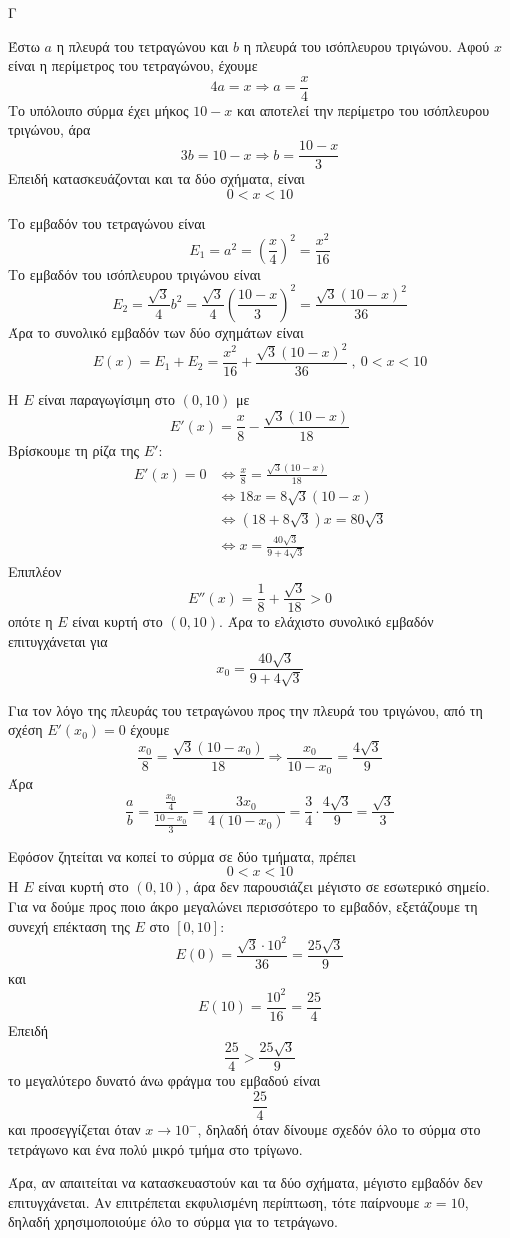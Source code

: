 \begin{thema}{Γ}
\begin{erwthma}
\item Έστω $a$ η πλευρά του τετραγώνου και $b$ η πλευρά του ισόπλευρου τριγώνου.
Αφού $x$ είναι η περίμετρος του τετραγώνου, έχουμε
\[4a=x\Rightarrow a=\frac{x}{4}\]
Το υπόλοιπο σύρμα έχει μήκος $10-x$ και αποτελεί την περίμετρο του ισόπλευρου τριγώνου, άρα
\[3b=10-x\Rightarrow b=\frac{10-x}{3}\]
Επειδή κατασκευάζονται και τα δύο σχήματα, είναι
\[0<x<10\]

\item Το εμβαδόν του τετραγώνου είναι
\[E_1=a^2=\left(\frac{x}{4}\right)^2=\frac{x^2}{16}\]
Το εμβαδόν του ισόπλευρου τριγώνου είναι
\[E_2=\frac{\sqrt{3}}{4}b^2=\frac{\sqrt{3}}{4}\left(\frac{10-x}{3}\right)^2=\frac{\sqrt{3}(10-x)^2}{36}\]
Άρα το συνολικό εμβαδόν των δύο σχημάτων είναι
\[E(x)=E_1+E_2=\frac{x^2}{16}+\frac{\sqrt{3}(10-x)^2}{36}\ ,\ 0<x<10\]

\item Η $E$ είναι παραγωγίσιμη στο $(0,10)$ με
\[E'(x)=\frac{x}{8}-\frac{\sqrt{3}(10-x)}{18}\]
Βρίσκουμε τη ρίζα της $E'$:
\begin{align*}
E'(x)=0
&\Leftrightarrow \frac{x}{8}=\frac{\sqrt{3}(10-x)}{18}\\
&\Leftrightarrow 18x=8\sqrt{3}(10-x)\\
&\Leftrightarrow (18+8\sqrt{3})x=80\sqrt{3}\\
&\Leftrightarrow x=\frac{40\sqrt{3}}{9+4\sqrt{3}}
\end{align*}
Επιπλέον
\[E''(x)=\frac{1}{8}+\frac{\sqrt{3}}{18}>0\]
οπότε η $E$ είναι κυρτή στο $(0,10)$. Άρα το ελάχιστο συνολικό εμβαδόν επιτυγχάνεται για
\[x_0=\frac{40\sqrt{3}}{9+4\sqrt{3}}\]

Για τον λόγο της πλευράς του τετραγώνου προς την πλευρά του τριγώνου, από τη σχέση $E'(x_0)=0$ έχουμε
\[\frac{x_0}{8}=\frac{\sqrt{3}(10-x_0)}{18}\Rightarrow \frac{x_0}{10-x_0}=\frac{4\sqrt{3}}{9}\]
Άρα
\[\frac{a}{b}=\frac{\frac{x_0}{4}}{\frac{10-x_0}{3}}=\frac{3x_0}{4(10-x_0)}=\frac{3}{4}\cdot\frac{4\sqrt{3}}{9}=\frac{\sqrt{3}}{3}\]

\item Εφόσον ζητείται να κοπεί το σύρμα σε δύο τμήματα, πρέπει
\[0<x<10\]
Η $E$ είναι κυρτή στο $(0,10)$, άρα δεν παρουσιάζει μέγιστο σε εσωτερικό σημείο.
Για να δούμε προς ποιο άκρο μεγαλώνει περισσότερο το εμβαδόν, εξετάζουμε τη συνεχή επέκταση της $E$ στο $[0,10]$:
\[E(0)=\frac{\sqrt{3}\cdot 10^2}{36}=\frac{25\sqrt{3}}{9}\]
και
\[E(10)=\frac{10^2}{16}=\frac{25}{4}\]
Επειδή
\[\frac{25}{4}>\frac{25\sqrt{3}}{9}\]
το μεγαλύτερο δυνατό άνω φράγμα του εμβαδού είναι
\[\frac{25}{4}\]
και προσεγγίζεται όταν $x\to 10^-$, δηλαδή όταν δίνουμε σχεδόν όλο το σύρμα στο τετράγωνο και ένα πολύ μικρό τμήμα στο τρίγωνο.

Άρα, αν απαιτείται να κατασκευαστούν και τα δύο σχήματα, μέγιστο εμβαδόν δεν επιτυγχάνεται.
Αν επιτρέπεται εκφυλισμένη περίπτωση, τότε παίρνουμε $x=10$, δηλαδή χρησιμοποιούμε όλο το σύρμα για το τετράγωνο.
\end{erwthma}
\end{thema}

